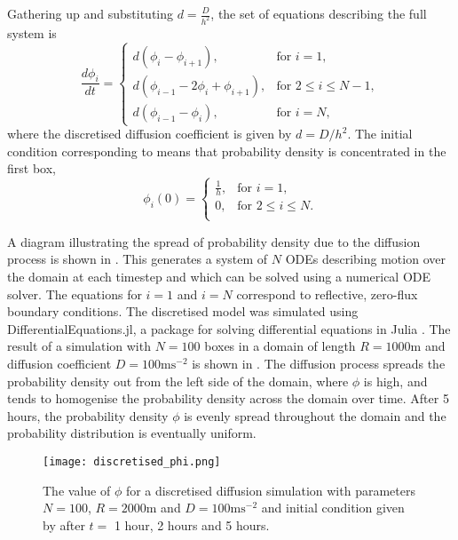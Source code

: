  Gathering up  and substituting $d = \frac{D}{h^2}$, the set of equations describing the full system is
 \begin{equation}
 \frac{d\phi_i}{dt} = \begin{cases}
 		d(\phi_i - \phi_{i+1}), & \text{for } i = 1, \\
 		d(\phi_{i-1}-2\phi_i +\phi_{i+1}), & \text{for } 2 \leq i \leq N-1, \\
 		d(\phi_{i-1}-\phi_i), & \text{for } i = N ,
 		\end{cases}
         \label{eqn:discrete_diffusion}
 \end{equation}
 where the discretised diffusion coefficient is given by
 $d = D/h^2$.
  The initial condition corresponding to  means that probability density is concentrated in the first box,
 \begin{equation}
 \phi_i(0) = \begin{cases}
 		\frac{1}{h}, & \text{for } i = 1, \\
 		0, & \text{for } 2 \leq i \leq N. \\
 		\end{cases}
         \label{eqn:discrete_diffusion_IC}
 \end{equation}

 A diagram illustrating the spread of probability density due to the diffusion process is shown in . This generates a system of $N$ ODEs describing motion over
 the domain at each timestep and which can be solved using a numerical ODE solver. The equations for $i=1$ and $i=N$ correspond to reflective, zero-flux boundary conditions. The discretised model was simulated using DifferentialEquations.jl, a package for solving differential equations in Julia \cite{DifferentialEquations}. The result of a simulation with $N = 100$ boxes in a domain of length $R = 1000$m and diffusion coefficient $D = 100\mathrm{ms^{-2}}$ is shown in . The diffusion process spreads the probability density out from the left side of the domain, where $\phi$ is high, and tends to homogenise the probability density across the domain over time. After 5 hours, the probability density $\phi$ is evenly spread throughout the domain and the probability distribution is eventually uniform.

  \begin{figure} [t]
      \centering
          \texttt{[image: discretised\_phi.png]}
          \caption{The value of $\phi$ for a discretised diffusion simulation with parameters $N = 100$, $R = 2000\mathrm{m}$ and $D = 100\mathrm{ms^{-2}}$ and initial condition given by  after $t = $ 1 hour, 2 hours and 5 hours.}
      \label{fig:discretised_phi}
  \end{figure}

